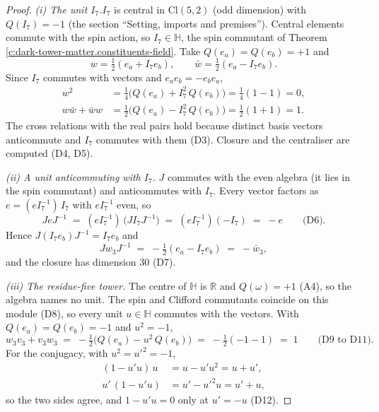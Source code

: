 \documentclass[11pt]{article}
\theoremstyle{definition}
\theoremstyle{plain}
\providecommand{\Cl}{}\renewcommand{\Cl}{\mathrm{Cl}}
\providecommand{\HH}{}\renewcommand{\HH}{\mathbb{H}}
\providecommand{\R}{}\renewcommand{\R}{\mathbb{R}}
\begin{document}
\begin{proof}
\textit{(i) The unit $I_{7}$.}\enspace $I_{7}$ is central in $\Cl(5,2)$ (odd dimension) with $Q(I_{7}) = -1$ (the section ``Setting, imports and premises''). Central elements commute with the spin action, so $I_{7} \in \HH$, the spin commutant of Theorem \ref{c:dark-tower-matter.constituents-field}. Take $Q(e_{a}) = Q(e_{b}) = +1$ and
\[
w = \tfrac{1}{2}(e_{a} + I_{7}e_{b}), \qquad \bar{w} = \tfrac{1}{2}(e_{a} - I_{7}e_{b}).
\]
Since $I_{7}$ commutes with vectors and $e_{a}e_{b} = -e_{b}e_{a}$,
\begin{align*}
w^{2} &= \tfrac{1}{4}\bigl(Q(e_{a}) + I_{7}^{2}\,Q(e_{b})\bigr) = \tfrac{1}{4}(1 - 1) = 0, \\
w\bar{w} + \bar{w}w &= \tfrac{1}{2}\bigl(Q(e_{a}) - I_{7}^{2}\,Q(e_{b})\bigr) = \tfrac{1}{2}(1 + 1) = 1.
\end{align*}
The cross relations with the real pairs hold because distinct basis vectors anticommute and $I_{7}$ commutes with them (D3). Closure and the centraliser are computed (D4, D5).



\emph{(ii) A unit anticommuting with $I_{7}$.}  $J$ commutes with the even algebra (it lies in the spin commutant) and anticommutes with $I_{7}$. Every vector factors as $e = (eI_{7}^{-1})\,I_{7}$ with $eI_{7}^{-1}$ even, so
\[
JeJ^{-1} \;=\; (eI_{7}^{-1})\,\bigl(JI_{7}J^{-1}\bigr) \;=\; (eI_{7}^{-1})(-I_{7}) \;=\; -e \qquad \text{(D6)}.
\]
Hence $J(I_{7}e_{b})J^{-1} = I_{7}e_{b}$ and
\[
Jw_{3}J^{-1} \;=\; -\tfrac{1}{2}(e_{a} - I_{7}e_{b}) \;=\; -\bar{w}_{3},
\]
and the closure has dimension $30$ (D7).



\emph{(iii) The residue-five tower.}  The centre of $\HH$ is $\R$ and $Q(\omega) = +1$ (A4), so the algebra names no unit. The spin and Clifford commutants coincide on this module (D8), so every unit $u \in \HH$ commutes with the vectors. With $Q(e_{a}) = Q(e_{b}) = -1$ and $u^{2} = -1$,
\[
w_{3}v_{3} + v_{3}w_{3} \;=\; -\tfrac{1}{2}\bigl(Q(e_{a}) - u^{2}\,Q(e_{b})\bigr) \;=\; -\tfrac{1}{2}(-1 - 1) \;=\; 1 \qquad \text{(D9 to D11)}.
\]
For the conjugacy, with $u^{2} = u'^{2} = -1$,
\begin{align*}
(1 - u'u)\,u &= u - u'u^{2} = u + u', \\
u'\,(1 - u'u) &= u' - u'^{2}u = u' + u,
\end{align*}
so the two sides agree, and $1 - u'u = 0$ only at $u' = -u$ (D12).

\end{proof}
\end{document}
